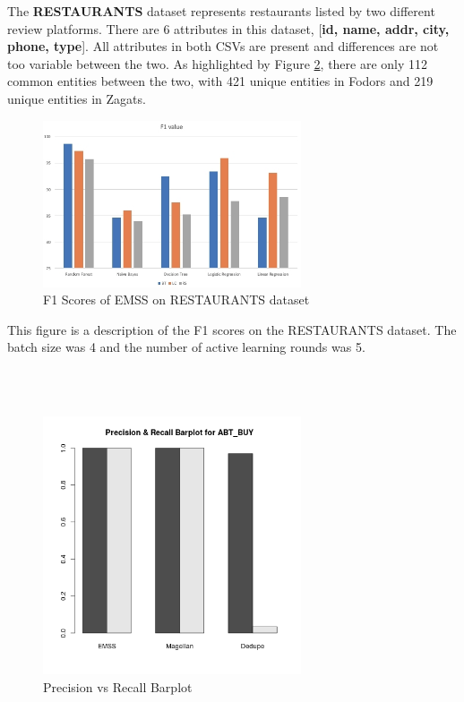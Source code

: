 \documentclass[letterpaper,twocolumn,10pt]{article}
\begin{document}
The \textbf{RESTAURANTS} dataset represents restaurants listed by two different review platforms. There are 6 attributes in this dataset, [\textbf{id, name, addr, city, phone, type}]. All attributes in both CSVs are present and differences are not too variable between the two. As highlighted by Figure \ref{fig:restaurants-png}, there are only 112 common entities between the two, with 421 unique entities in Fodors and 219 unique entities in Zagats.


\begin{figure}[H]
\centering
\includegraphics[width=3in]{figures/figure_1_f1.jpg}
\caption{F1 Scores of EMSS on RESTAURANTS dataset}
\label{fig:restaurants-png}
\end{figure}

This figure is a description of the F1 scores on the RESTAURANTS dataset. The batch size was 4 and the number of active learning rounds was 5. 


\noindent{}
\\\\

\begin{figure}[H]
\centering
\includegraphics[width=3in]{figures/figure_2_barplot.png}
\caption{Precision vs Recall Barplot}
\label{fig:restaurants-png}
\end{figure}
\end{document}
